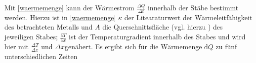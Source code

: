 Mit \eqref{waermemenge} kann der Wärmestrom $\frac{\Delta{Q}}{\Delta{t}}$ innerhalb der Stäbe bestimmt werden. 
Hierzu ist in \eqref{waermemenge} $\kappa$ der Litearaturwert der Wärmeleitfähigkeit des betrachteten Metalls und $A$ die Querschnittsfläche (vgl. hierzu \cite{V204}) des jeweiligen Stabes; $\frac{\partial T}{\partial x}$ ist der Temperaturgradient innerhalb des Stabes und wird hier mit $\frac{\Delta T}{\Delta x}$ und $\Delta x$genähert.
Es ergibt sich für die Wärmemenge $\mathup{d}Q$ zu fünf unterschiedlichen Zeiten\\
%
